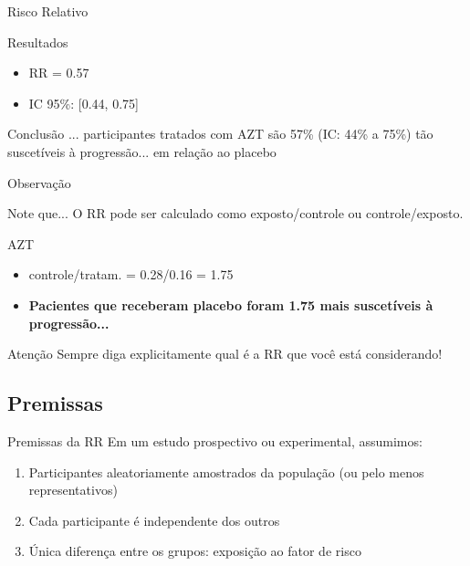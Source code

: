 \documentclass{beamer}
\begin{document}
\begin{frame}{Risco Relativo}
  \begin{exampleblock}{Resultados}
    \begin{itemize}
      \footnotesize
    \item RR = 0.57
    \item IC 95\%: [0.44, 0.75]
    \end{itemize}
  \end{exampleblock}

  \bigskip
  \begin{exampleblock}{Conclusão}
    ... participantes tratados com AZT são 57\% (IC: 44\% a 75\%) tão suscetíveis à progressão... em relação ao placebo
  \end{exampleblock}
\end{frame}

\begin{frame}{Observação}
  \begin{block}{Note que...}
    O RR pode ser calculado como exposto/controle ou controle/exposto.
  \end{block}
  \begin{exampleblock}{AZT}
    \begin{itemize}
    \item controle/tratam. = 0.28/0.16 = 1.75
    \item {\bf Pacientes que receberam placebo foram 1.75 mais suscetíveis à progressão...}
    \end{itemize}
  \end{exampleblock}
  \begin{block}{Atenção}
    Sempre diga explicitamente qual é a RR que você está considerando!
  \end{block}
\end{frame}

\subsection{Premissas}

\begin{frame}{Premissas da RR}
  Em um estudo prospectivo ou experimental, assumimos:
  \begin{enumerate}
  \item Participantes aleatoriamente amostrados da população (ou pelo menos representativos)
  \item Cada participante é independente dos outros
  \item Única diferença entre os grupos: exposição ao fator de risco
  \end{enumerate}
\end{frame}
\end{document}
